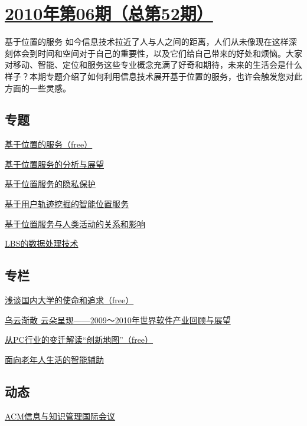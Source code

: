 \documentclass[a4paper]{article}
\begin{document}
\section{\href{http://history.ccf.org.cn/sites/ccf/jsjtbbd.jsp?contentId=2552628433519}{\textbf{2010年第06期（总第52期）}}}
基于位置的服务 如今信息技术拉近了人与人之间的距离，人们从未像现在这样深刻体会到时间和空间对于自己的重要性，以及它们给自己带来的好处和烦恼。大家对移动、智能、定位和服务这些专业概念充满了好奇和期待，未来的生活会是什么样子？本期专题介绍了如何利用信息技术展开基于位置的服务，也许会触发您对此方面的一些灵感。
\subsection{专题}
\href{http://history.ccf.org.cn/resources/1190201776262/2010/06/12/201006-1.pdf}{基于位置的服务（free）}

\href{http://history.ccf.org.cn/resources/1190201776262/2010/06/12/201006-2.pdf}{基于位置服务的分析与展望}

\href{http://history.ccf.org.cn/resources/1190201776262/2010/06/12/201006-3.pdf}{基于位置服务的隐私保护}

\href{http://history.ccf.org.cn/resources/1190201776262/2010/06/12/201006-4.pdf}{基于用户轨迹挖掘的智能位置服务}

\href{http://history.ccf.org.cn/resources/1190201776262/2010/06/12/201006-5.pdf}{基于位置服务与人类活动的关系和影响}

\href{http://history.ccf.org.cn/resources/1190201776262/2010/06/12/201006-6.pdf}{LBS的数据处理技术}

\subsection{专栏}
\href{http://history.ccf.org.cn/resources/1190201776262/2010/06/12/201006-7.pdf}{浅谈国内大学的使命和追求（free）}

\href{http://history.ccf.org.cn/resources/1190201776262/2010/06/12/201006-8.pdf}{乌云渐散  云朵呈现——2009～2010年世界软件产业回顾与展望}

\href{http://history.ccf.org.cn/resources/1190201776262/2010/06/12/201006-9.pdf}{从PC行业的变迁解读“创新地图”（free）}

\href{http://history.ccf.org.cn/resources/1190201776262/2010/06/12/201006-10.pdf}{面向老年人生活的智能辅助}

\subsection{动态}
\href{http://history.ccf.org.cn/resources/1190201776262/2010/06/12/201006-11.pdf}{ACM信息与知识管理国际会议}
\end{document}
